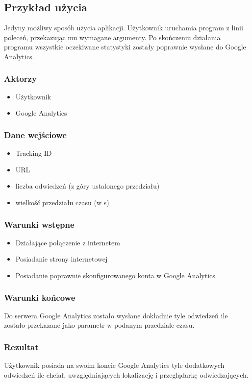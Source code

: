 \documentclass{article}
\begin{document}
\subsection{Przykład użycia}
Jedyny możliwy sposób użycia aplikacji. Użytkownik uruchamia program z linii poleceń, przekazując mu wymagane argumenty. Po skończeniu działania programu wszystkie oczekiwane statystyki zostały poprawnie wysłane do Google Analytics.

\subsubsection{Aktorzy}
\begin{itemize}
\item Użytkownik
\item Google Analytics
\end{itemize}

\subsubsection{Dane wejściowe}
\begin{itemize}
\item Tracking ID
\item URL
\item liczba odwiedzeń (z góry ustalonego przedziału)
\item wielkość przedziału czasu (w s)
\end{itemize}

\subsubsection{Warunki wstępne}
\begin{itemize}
\item Działające połączenie z internetem
\item Posiadanie strony internetowej
\item Posiadanie poprawnie skonfigurowanego konta w Google Analytics
\end{itemize}

\subsubsection{Warunki końcowe}
Do serwera Google Analytics zostało wysłane dokładnie tyle odwiedzeń ile zostało przekazane jako parametr w podanym przedziale czasu.

\subsubsection{Rezultat}
Użytkownik posiada na swoim koncie Google Analytics tyle dodatkowych odwiedzeń ile chciał, uwzględniających lokalizację i przeglądarkę odwiedzających.
\end{document}
